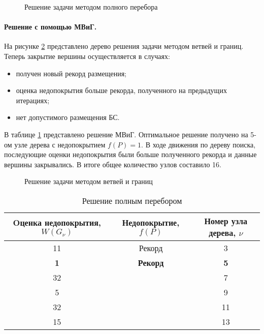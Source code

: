 \begin{figure}[ht]
  \caption{Решение задачи методом полного перебора}\label{fig:part2_brute_force_tree}
\end{figure}

\paragraph{Решение с помощью МВиГ.}

 На рисунке \cref{fig:part2_branch_and_bound_tree} представлено дерево решения задачи методом ветвей и границ. Теперь закрытие вершины осуществляется в случаях:
 \begin{itemize}
   \item получен новый рекорд размещения;
   \item оценка недопокрытия больше рекорда, полученного на предыдущих итерациях;
   \item нет допустимого размещения БС.
\end{itemize} 


В таблице \cref{tab:branch_and_bound_solution} представлено решение МВиГ. Оптимальное решение получено на 5-ом узле дерева с недопокрытием $f(P)=1$. В ходе движения по дереву поиска, последующие оценки недопокрытия были больше полученного рекорда и данные вершины закрывались. В итоге общее количество узлов составило 16.


\begin{figure}[ht]
  \caption{Решение задачи методом ветвей и границ}\label{fig:part2_branch_and_bound_tree}
\end{figure}

\begin{table}[h!]\centering
  \begin{tabular}{|c|c|c|}\hline
      
      Oценка недопокрытия, $W(G_\nu)$ & Недопокрытие, $f(P)$ & Номер узла дерева, $\nu$\\
      \hline
      11 & Рекорд & 3\\
      \textbf{1} & \textbf{Рекорд} & \textbf{5}\\
      32 &  & 7\\
      5 &  & 9\\
      32 &  & 11\\
      15 &  & 13\\
      \hline

\end{tabular}\caption{Решение полным перебором}\label{tab:branch_and_bound_solution}
\end{table}




